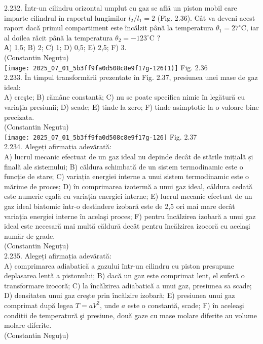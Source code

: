 2.232. Într-un cilindru orizontal umplut cu gaz se află un piston mobil care imparte cilindrul în raportul lungimilor $l_{2} / l_{1}=2$ (Fig. 2.36). Cât va deveni acest raport dacă primul compartiment este încălzit până la temperatura $\theta_{1}=27^{\circ} \mathrm{C}$, iar al doilea răcit până la temperatura $\theta_{2}=-123^{\circ} \mathrm{C}$ ?\\ А) 1,5; B) 2; C) 1; D) 0,5; E) 2,5; F) 3.\\ (Constantin Neguțu)\\ \texttt{[image: 2025\_07\_01\_5b3ff9fa0d508c8e9f17g-126(1)]} Fig. 2.36\\

2.233. În timpul transformării prezentate în Fig. 2.37, presiunea unei mase de gaz ideal:\\ A) creşte; B) rămâne constantă; C) nu se poate specifica nimic în legătură cu variația presiunii; D) scade; E) tinde la zero; F) tinde asimptotic la o valoare bine precizata.\\ (Constantin Negutu)\\ \texttt{[image: 2025\_07\_01\_5b3ff9fa0d508c8e9f17g-126]} Fig. 2.37\\

2.234. Alegeți afirmația adevărată:\\ A) lucrul mecanic efectuat de un gaz ideal nu depinde decât de stările inițială și finală ale sistemului; B) căldura schimbată de un sistem termodinamic este o funcție de stare; C) variația energiei interne a unui sistem termodinamic este o mărime de proces; D) în comprimarea izotermă a unui gaz ideal, cǎldura cedată este numeric egală cu variația energiei interne; E) lucrul mecanic efectuat de un gaz ideal biatomic într-o destindere izobară este de 2,5 ori mai mare decât variația energiei interne în acelaşi proces; F) pentru încălzirea izobară a unui gaz ideal este necesară mai multă căldură decât pentru încălzirea izocoră cu acelaşi număr de grade.\\ (Constantin Neguțu)\\

2.235. Alegeți afirmația adevărată:\\ A) comprimarea adiabatică a gazului într-un cilindru cu piston presupune deplasarea lentă a pistonului; B) dacă un gaz este comprimat lent, el suferă o transformare izocoră; C) la încălzirea adiabatică a unui gaz, presiunea sa scade; D) densitatea unui gaz creşte prin încălzire izobară; E) presiunea unui gaz comprimat după legea $T=a V^{2}$, unde $a$ este o constantă, scade; F) în aceleaşi condiții de temperatură şi presiune, două gaze cu mase molare diferite au volume molare diferite.\\ (Constantin Neguțu)\\

